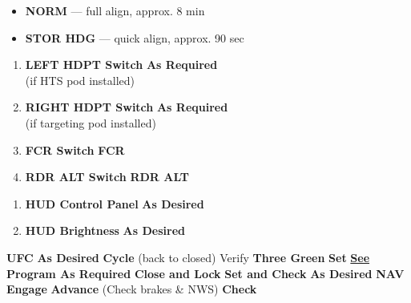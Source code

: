 \begin{checklistenumerate}
\begin{enumerate}
        \begin{itemize}
            \item \textbf{NORM} --- full align, approx. 8 min
            \item \textbf{STOR HDG} --- quick align, approx. 90 sec
        \end{itemize}
    \end{enumerate}
    \begin{enumerate}
        \item \textbf{LEFT HDPT Switch} \dotfill \textbf{As Required} \\
        \hfill (if HTS pod installed)
        \item \textbf{RIGHT HDPT Switch} \dotfill \textbf{As Required} \\
        \hfill (if targeting pod installed)
        \item \textbf{FCR Switch} \dotfill \textbf{FCR}
        \item \textbf{RDR ALT Switch} \dotfill \textbf{RDR ALT}
    \end{enumerate}\cbend
\end{checklistenumerate}

\clearpage

\begin{checklistenumerate}[resume]
    \cbstart
    \begin{enumerate}
        \item \textbf{HUD Control Panel} \dotfill \textbf{As Desired}
        \item \textbf{HUD Brightness} \dotfill \textbf{As Desired} 
    \end{enumerate}\cbend
    \blueitem[C\&I Knob]\dotfill\textbf{UFC}
    \cbstart\dotfill\textbf{As Desired}\cbend
    \dotfill\textbf{Cycle} (back to closed)
    \dotfill Verify \textbf{Three Green}
    \dotfill\textbf{Set}
    \dotfill\hyperref[subsec:testschecks]{\textbf{See }}
    \cbstart\dotfill\textbf{Program As Required}
    \blueitem[Canopy]\dotfill\textbf{Close and Lock}
    \blueitem[Altimeter]\dotfill\textbf{Set and Check}
    \dotfill\textbf{As Desired}
    \dotfill\textbf{NAV}\cbend
    \blueitem[NWS]\dotfill\textbf{Engage}
    \blueitem[Throttle]\dotfill\textbf{Advance} (Check brakes \& NWS)
    \dotfill\textbf{Check}
\end{checklistenumerate}

